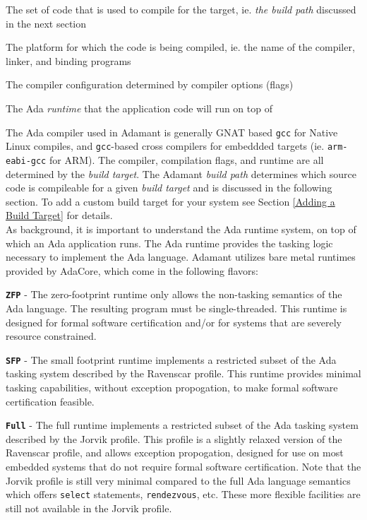 \vspace{5mm} %
\begin{spacedenumerate}
  \item The set of code that is used to compile for the target, ie. \textit{the build path} discussed in the next section
  \item The platform for which the code is being compiled, ie. the name of the compiler, linker, and binding programs
  \item The compiler configuration determined by compiler options (flags)
  \item The Ada \textit{runtime} that the application code will run on top of
\end{spacedenumerate}
\vspace{5mm} %

The Ada compiler used in Adamant is generally GNAT based \texttt{gcc} for Native Linux compiles, and \texttt{gcc}-based cross compilers for embeddded targets (ie. \texttt{arm-eabi-gcc} for ARM). The compiler, compilation flags, and runtime are all determined by the \textit{build target}. The Adamant \textit{build path} determines which source code is compileable for a given \textit{build target} and is discussed in the following section. To add a custom build target for your system see Section \ref{Adding a Build Target} for details. \\

As background, it is important to understand the Ada runtime system, on top of which an Ada application runs. The Ada runtime provides the tasking logic necessary to implement the Ada language. Adamant utilizes bare metal runtimes provided by AdaCore, which come in the following flavors:

\vspace{5mm} %
\begin{spaceditemize}
  \item \textbf{\texttt{ZFP}} - The zero-footprint runtime only allows the non-tasking semantics of the Ada language. The resulting program must be single-threaded. This runtime is designed for formal software certification and/or for systems that are severely resource constrained.
  \item \textbf{\texttt{SFP}} - The small footprint runtime implements a restricted subset of the Ada tasking system described by the Ravenscar profile. This runtime provides minimal tasking capabilities, without exception propogation, to make formal software certification feasible.
  \item \textbf{\texttt{Full}} - The full runtime implements a restricted subset of the Ada tasking system described by the Jorvik profile. This profile is a slightly relaxed version of the Ravenscar profile, and allows exception propogation, designed for use on most embedded systems that do not require formal software certification. Note that the Jorvik profile is still very minimal compared to the full Ada language semantics which offers \texttt{select} statements, \texttt{rendezvous}, etc. These more flexible facilities are still not available in the Jorvik profile.
\end{spaceditemize}
\vspace{5mm} %


